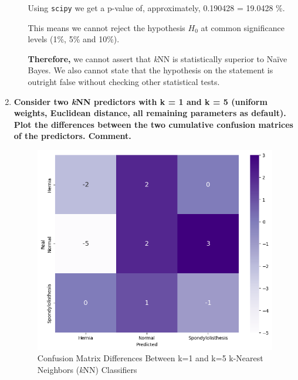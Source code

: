\documentclass[12pt]{article}
\begin{document}
\begin{enumerate}[leftmargin=\labelsep]
\begin{enumerate}
                

                Using \texttt{scipy} we get a p-value of, approximately, 0.190428 = 19.0428 \%.

                This means we cannot reject the hypothesis $H_0$ at common significance levels (1\%, 5\% and 10\%).

                \textbf{Therefore,} we cannot assert that \textit{k}NN is statistically superior to Naïve Bayes. We also cannot
                state that the hypothesis on the statement is outright false without checking other statistical tests.
        \end{enumerate}

  \item \textbf{Consider two \textit{k}NN predictors with k = 1 and k = 5 (uniform weights, Euclidean distance,
          all remaining parameters as default). Plot the differences between the two cumulative confusion
          matrices of the predictors. Comment.}

        \vskip 0.3cm
        

        \begin{figure}[H]
          \centering
          \includegraphics[width=13cm]{./assets/cumulative_heatmap_ex2_PartII.png}
          \caption{Confusion Matrix Differences Between k=1 and k=5 k-Nearest Neighbors (\textit{k}NN) Classifiers}
          \label{fig:PartII-ex2}
        \end{figure}


\end{enumerate}
\end{document}
